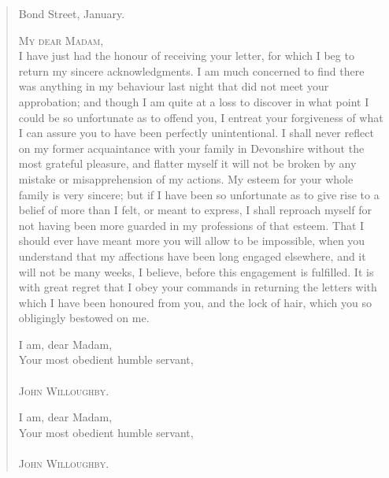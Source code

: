 \begin{quotation}
\begin{flushright}
Bond Street, January.
\end{flushright}

\noindent \textsc{My dear Madam},
~\\
\indent    I have just had the honour of receiving your letter, for which I beg to return my sincere acknowledgments. I am much concerned to find there was anything in my behaviour last night that did not meet your approbation; and though I am quite at a loss to discover in what point I could be so unfortunate as to offend you, I entreat your forgiveness of what I can assure you to have been perfectly unintentional. I shall never reflect on my former acquaintance with your family in Devonshire without the most grateful pleasure, and flatter myself it will not be broken by any mistake or misapprehension of my actions. My esteem for your whole family is very sincere; but if I have been so unfortunate as to give rise to a belief of more than I felt, or meant to express, I shall reproach myself for not having been more guarded in my professions of that esteem. That I should ever have meant more you will allow to be impossible, when you understand that my affections have been long engaged elsewhere, and it will not be many weeks, I believe, before this engagement is fulfilled. It is with great regret that I obey your commands in returning the letters with which I have been honoured from you, and the lock of hair, which you so obligingly bestowed on me.

\begin{a4}
	\begin{flushright}
	\begin{minipage}{.5\textwidth}
	I am, dear Madam,\\                      
	Your most obedient humble servant,\\    
	~\\
	\textsc{John Willoughby}.
	\end{minipage}
	\end{flushright}
\end{a4}

\begin{letter}
	\begin{flushright}
	\begin{minipage}{.3\textwidth}
	I am, dear Madam,\\                      
	Your most obedient humble servant,\\    
	~\\
	\textsc{John Willoughby}.
	\end{minipage}
	\end{flushright}
\end{letter}


\end{quotation}

